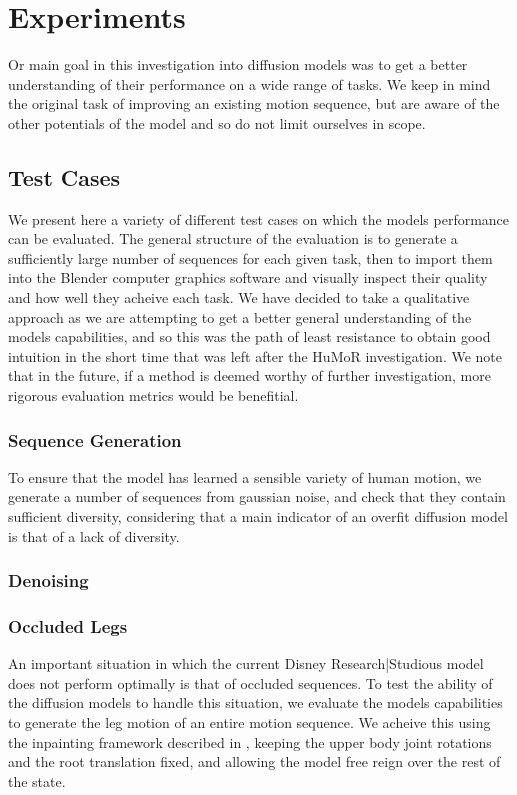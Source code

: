\section{Experiments}
\label{sec:diffusion_experiments}

Or main goal in this investigation into diffusion models was to get a better understanding of their performance on a wide range of tasks. We keep in mind the original task of improving an existing motion sequence, but are aware of the other potentials of the model and so do not limit ourselves in scope.


\subsection{Test Cases}
We present here a variety of different test cases on which the models performance can be evaluated. The general structure of the evaluation is to generate a sufficiently large number of sequences for each given task, then to import them into the Blender computer graphics software and visually inspect their quality and how well they acheive each task. We have decided to take a qualitative approach as we are attempting to get a better general understanding of the models capabilities, and so this was the path of least resistance to obtain good intuition in the short time that was left after the HuMoR investigation. We note that in the future, if a method is deemed worthy of further investigation, more rigorous evaluation metrics would be benefitial.

\subsubsection{Sequence Generation}
To ensure that the model has learned a sensible variety of human motion, we generate a number of sequences from gaussian noise, and check that they contain sufficient diversity, considering that a main indicator of an overfit diffusion model is that of a lack of diversity.

\subsubsection{Denoising}

\subsubsection{Occluded Legs}
An important situation in which the current Disney Research|Studious model does not perform optimally is that of occluded sequences. To test the ability of the diffusion models to handle this situation, we evaluate the models capabilities to generate the leg motion of an entire motion sequence. We acheive this using the inpainting framework described in , keeping the upper body joint rotations and the root translation fixed, and allowing the model free reign over the rest of the state.

